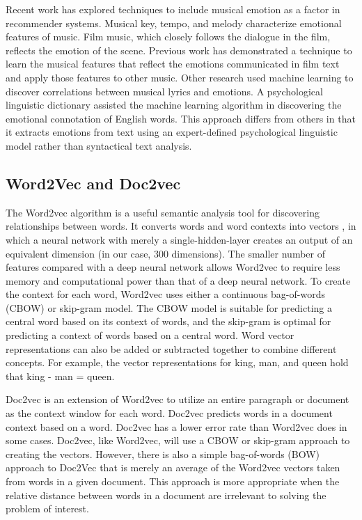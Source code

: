 \documentclass[10pt,twocolumn]{article}
\begin{document}
Recent work has explored techniques to include musical emotion as a factor in recommender systems.  Musical key, tempo, and melody characterize emotional features of music.  Film music, which closely follows the dialogue in the film, reflects the emotion of the scene.  Previous work has demonstrated a technique to learn the musical features that reflect the emotions communicated in film text and apply those features to other music. \cite{a2}  Other research used machine learning to discover correlations between musical lyrics and emotions. \cite{a3}  A psychological linguistic dictionary assisted the machine learning algorithm in discovering the emotional connotation of English words.  This approach differs from others in that it extracts emotions from text using an expert-defined psychological linguistic model rather than syntactical text analysis.

\subsection{Word2Vec and Doc2vec}
The Word2vec algorithm is a useful semantic analysis tool for discovering relationships between words.  It converts words and word contexts into vectors \cite{a4,a5,a6}, in which a neural network with merely a single-hidden-layer creates an output of an equivalent dimension (in our case, 300 dimensions). The smaller number of features compared with a deep neural network allows Word2vec to require less memory and computational power than that of a deep neural network.  To create the context for each word, Word2vec uses either a continuous bag-of-words (CBOW) or skip-gram model.  The CBOW model is suitable for predicting a central word based on its context of words, and the skip-gram is optimal for predicting a context of words based on a central word.   Word vector representations can also be added or subtracted together to combine different concepts.  For example, the vector representations for king, man, and queen hold that king - man = queen.

Doc2vec is an extension of Word2vec to utilize an entire paragraph or document as the context window for each word. \cite{a7,a8}  Doc2vec predicts words in a document context based on a word.  Doc2vec has a lower error rate than Word2vec does in some cases.  Doc2vec, like Word2vec, will use a CBOW or skip-gram approach to creating the vectors.  However, there is also a simple bag-of-words (BOW) approach to Doc2Vec that is merely an average of the Word2vec vectors taken from words in a given document. This approach is more appropriate when the relative distance between words in a document are irrelevant to solving the problem of interest. 
\end{document}

